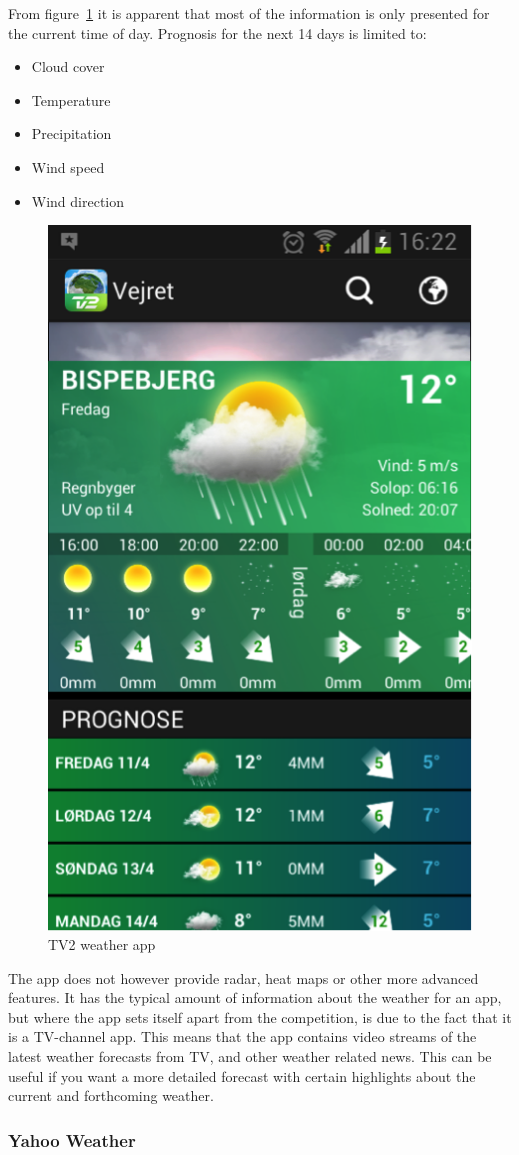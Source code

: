 From figure~\ref{fig:tv21} it is apparent that most of the information is only presented for the current time of day. 
Prognosis for the next 14 days is limited to:

\begin{itemize}
    \item Cloud cover
    \item Temperature
    \item Precipitation
    \item Wind speed
    \item Wind direction
\end{itemize}

\begin{figure}[!htbp]
    \centering
    \includegraphics[width=.4\textwidth]{images/Tv21.png}
    \caption{TV2 weather app}
    \label{fig:tv21}
\end{figure}

The app does not however provide radar, heat maps or other more advanced features. 
It has the typical amount of information about the weather for an app, but where the app sets itself apart from the competition, is due to the fact that it is a TV-channel app. 
This means that the app contains video streams of the latest weather forecasts from TV, and other weather related news. 
This can be useful if you want a more detailed forecast with certain highlights about the current and forthcoming weather. 



\subsubsection*{Yahoo Weather} %
\label{ssub:yahoo_weather}

